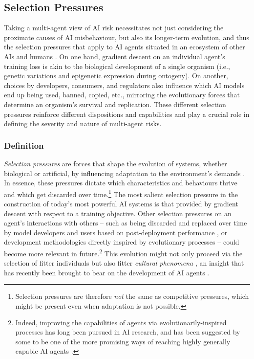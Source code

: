 \subsection{Selection Pressures}
\label{sec:selection_pressures}


Taking a multi-agent view of AI risk necessitates not just considering the proximate causes of AI misbehaviour, but also its longer-term evolution, and thus the selection pressures that apply to AI agents situated in an ecosystem of other AIs and humans \citep{rahwan2019machine}.
On one hand, gradient descent on an individual agent's training loss is akin to the biological development of a single organism (i.e., genetic variations and epigenetic expression during ontogeny).
On another, choices by developers, consumers, and regulators also influence which AI models end up being used, banned, copied, etc., mirroring the evolutionary forces that determine an organism's survival and replication.
These different selection pressures reinforce different dispositions and capabilities and play a crucial role in defining the severity and nature of multi-agent risks.

\subsubsection{Definition}


\textit{Selection pressures} are forces that shape the evolution of systems, whether biological or artificial, by influencing adaptation to the environment's demands \citep{okasha2006evolution,bedau2000open}.
In essence, these pressures dictate which characteristics and behaviours thrive and which get discarded over time.\footnote{Selection pressures are therefore \textit{not} the same as competitive pressures, which might be present even when adaptation is not possible.}
The most salient selection pressure in the construction of today's most powerful AI systems is that provided by gradient descent with respect to a training objective.
Other selection pressures on an agent's interactions with others -- such as being discarded and replaced over time by model developers and users based on post-deployment performance \citep{brinkmann2023machine,rahwan2019machine}, or development methodologies directly inspired by evolutionary processes \citep{jaderberg2019human,telikani2021evolutionary,Lehman2022} -- could become more relevant in future.\footnote{Indeed, improving the capabilities of agents via evolutionarily-inspired processes has long been pursued in AI research, and has been suggested by some to be one of the more promising ways of reaching highly generally capable AI agents \citep{Stanley2017,Clune2019,Bhoopchand2023,Leibo2018-jc,leibo2019autocurricula,Baker2019,Open_Ended_Learning_Team2021-oj}.}
This evolution might not only proceed via the selection of fitter individuals but also fitter \textit{cultural phenomena} \citep{Richerson2010}, an insight that has recently been brought to bear on the development of AI agents \citep{Bhoopchand2023,brinkmann2023machine,zimmaro2024emergence,Perez2024}.

